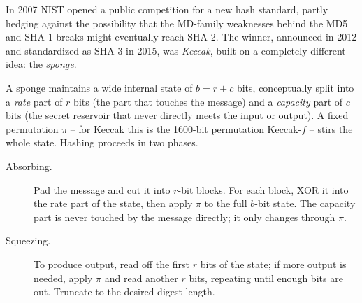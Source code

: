 In 2007 NIST opened a public competition for a new hash standard, partly hedging against the possibility that the MD-family weaknesses behind the MD5 and SHA-1 breaks might eventually reach SHA-2. The winner, announced in 2012 and standardized as SHA-3 in 2015, was \emph{Keccak}, built on a completely different idea: the \emph{sponge}.

A sponge maintains a wide internal state of $b = r + c$ bits, conceptually split into a \emph{rate} part of $r$ bits (the part that touches the message) and a \emph{capacity} part of $c$ bits (the secret reservoir that never directly meets the input or output). A fixed permutation $\pi$ -- for Keccak this is the 1600-bit permutation Keccak-$f$ -- stirs the whole state. Hashing proceeds in two phases.

\begin{description}
  \item[Absorbing.] Pad the message and cut it into $r$-bit blocks. For each block, XOR it into the rate part of the state, then apply $\pi$ to the full $b$-bit state. The capacity part is never touched by the message directly; it only changes through $\pi$.
  \item[Squeezing.] To produce output, read off the first $r$ bits of the state; if more output is needed, apply $\pi$ and read another $r$ bits, repeating until enough bits are out. Truncate to the desired digest length.
\end{description}

\begin{center}
\end{center}

